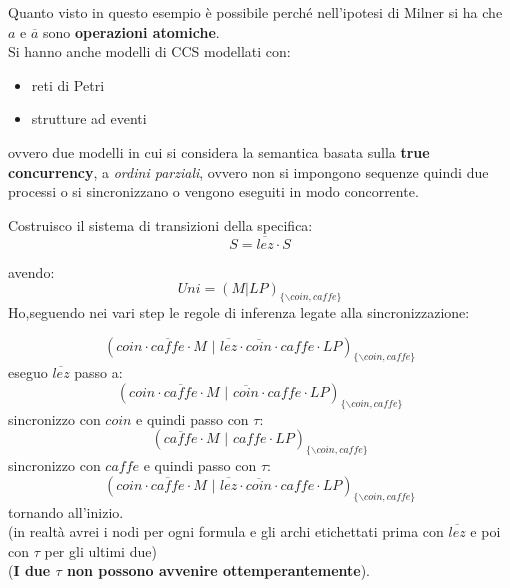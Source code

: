 \documentclass[a4paper,12pt, oneside]{book}
\begin{document}
Quanto visto in questo esempio è possibile perché nell'ipotesi di Milner si ha
che $a$ e $\overline{a}$ sono \textbf{operazioni atomiche}.\\
Si hanno anche modelli di CCS modellati con:
\begin{itemize}
  \item reti di Petri
  \item strutture ad eventi
\end{itemize}
ovvero due modelli in cui si considera la semantica basata sulla \textbf{true
  concurrency}, a \textit{ordini parziali}, ovvero non si impongono sequenze
quindi due processi o si sincronizzano o vengono eseguiti in modo concorrente.
\begin{esempio}
  Costruisco il sistema di transizioni della specifica:
  \[S=\overline{lez}\cdot S\]
  \begin{center}
  \end{center}
  avendo:
  \[Uni=(M|LP)_{\{\backslash coin, caffe\}}\]
  Ho,seguendo nei vari step le regole di inferenza legate alla
  sincronizzazione:
  
  \[(coin\cdot \overline{caffe}\cdot
    M\,\,|\,\,\overline{lez}\cdot\overline{coin}\cdot caffe\cdot
    LP)_{\{\backslash coin, caffe\}}\]
  eseguo $\overline{lez}$ passo a:
  \[(coin\cdot \overline{caffe}\cdot
    M\,\,|\,\,\overline{coin}\cdot caffe\cdot
    LP)_{\{\backslash coin, caffe\}}\]
  sincronizzo con $coin$ e quindi passo con $\tau$:
  \[(\overline{caffe}\cdot
    M\,\,|\,\, caffe\cdot
    LP)_{\{\backslash coin, caffe\}}\]
  sincronizzo con $caffe$ e quindi passo con $\tau$:
   \[(coin\cdot \overline{caffe}\cdot
    M\,\,|\,\,\overline{lez}\cdot\overline{coin}\cdot caffe\cdot
    LP)_{\{\backslash coin, caffe\}}\]
  tornando all'inizio.\\
  (in realtà avrei i nodi per ogni formula e gli archi etichettati prima con
  $\overline{lez}$ e poi con $\tau$ per gli ultimi due)\\
  (\textbf{I due $\tau$ non possono avvenire ottemperantemente}).\\
  
\end{esempio}
\end{document}
